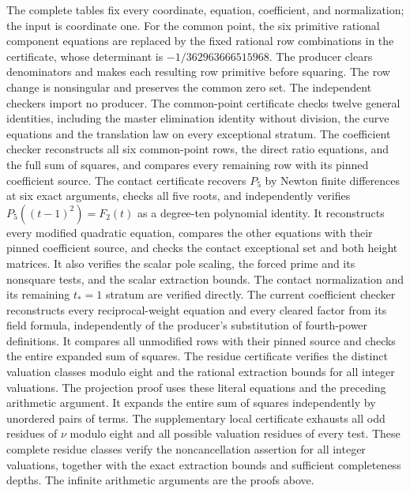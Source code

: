 \documentclass[11pt,a4paper]{article}
\begin{document}
The complete tables fix every coordinate, equation, coefficient, and
normalization; the input is coordinate one. For the common point,
the six primitive rational component equations are replaced by the
fixed rational row combinations in the certificate, whose determinant
is $-1/362963666515968$. The producer clears denominators and makes
each resulting row primitive before squaring. The row change is
nonsingular and preserves the common zero set.
The independent checkers import no producer. The common-point
certificate checks twelve general identities, including the master
elimination identity without division, the curve equations and the
translation law on every exceptional stratum. The coefficient checker
reconstructs all six common-point rows, the direct ratio equations,
and the full sum of squares, and compares every remaining row with
its pinned coefficient source. The contact certificate recovers $P_5$ by
Newton finite differences at six exact arguments, checks all five roots,
and independently verifies $P_5((t-1)^2)=F_2(t)$ as a degree-ten
polynomial identity. It reconstructs every modified quadratic equation,
compares the other equations with their pinned coefficient source, and
checks the contact exceptional set and both height matrices. It also verifies the scalar pole scaling, the forced prime and its nonsquare tests, and the scalar extraction bounds.
The contact normalization and its remaining $t_*=1$ stratum are
verified directly. The current coefficient checker reconstructs every
reciprocal-weight equation and every cleared factor from its field
formula, independently of the producer's substitution of fourth-power
definitions. It compares all unmodified rows with their pinned source
and checks the entire expanded sum of squares. The residue certificate
verifies the distinct valuation classes modulo eight and the rational
extraction bounds for all integer valuations.
The projection proof uses these literal equations and the preceding
arithmetic argument.
It expands the entire sum of squares independently by unordered
pairs of terms. The supplementary local certificate exhausts all
odd residues of $\nu$ modulo eight and all possible valuation residues
of every test. These complete residue classes verify the
noncancellation assertion for all integer valuations, together with
the exact extraction bounds and sufficient completeness depths.
The infinite arithmetic arguments are the proofs above.
\end{document}
